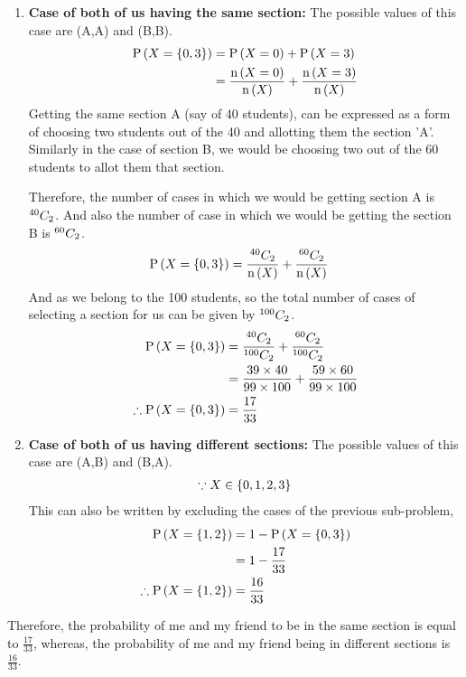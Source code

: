\documentclass[journal,12pt,twocolumn]{IEEEtran}
\begin{document}
    \begin{enumerate}[label=(\roman*)]
    \item\textbf{Case of both of us having the same section:} The possible values of this case are (A,A) and (B,B).
    \begin{align}
\text{P}\left(X=\left\{0,3\right\}\right) &= \text{P}\left(X=0\right) + \text{P}\left(X=3\right)\\
                             &= \frac{\text{n}\left(X = 0\right)}{\text{n}\left(X\right)}+\frac{\text{n}\left(X = 3\right)}{\text{n}\left(X\right)}
\end{align}
Getting the same section A (say of 40 students), can be expressed as a form of choosing two students out of the 40 and allotting them the section 'A'. Similarly in the case of section B, we would be choosing two out of the 60 students to allot them that section.\\
\par Therefore, the number of cases in which we would be getting section A is ${}^{40}C_{2}$. And also the number of case in which we would be getting the section B is ${}^{60}C_{2}$.\\
\begin{align}
\text{P}\left(X=\left\{0,3\right\}\right) &= \frac{{}^{40}C_{2}}{\text{n}\left(X\right)} + \frac{{}^{60}C_{2}}{\text{n}\left(X\right)}
\end{align}
And as we belong to the 100 students, so the total number of cases of selecting a section for us can be given by ${}^{100}C_{2}$.
\begin{align}
\text{P}\left(X=\left\{0,3\right\}\right) &= \frac{{}^{40}C_{2}}{{}^{100}C_{2}} + \frac{{}^{60}C_{2}}{{}^{100}C_{2}}  \quad \\
                             &= \frac{39 \times 40}{99 \times 100}+\frac{59 \times 60}{99 \times 100}\\
\therefore\text{P}\left(X=\left\{0,3\right\}\right) &= \frac{17}{33}
    \end{align}
    \item\textbf{Case of both of us having different sections:} The possible values of this case are (A,B) and (B,A).
    \begin{align*}
    \because X \in \left\{0,1,2,3\right\}
    \end{align*}
    This can also be written by excluding the cases of the previous sub-problem,
    \begin{align}
    \text{P}\left(X=\left\{1,2\right\}\right) &= 1-\text{P}\left(X=\left\{0,3\right\}\right)\\
                                 &= 1-\frac{17}{33}\\
\therefore\text{P}\left(X=\left\{1,2\right\}\right) &= \frac{16}{33}
    \end{align}
	\end{enumerate}
	\par Therefore, the probability of me and my friend to be in the same section is equal to $\frac{17}{33}$, whereas, the probability of me and my friend being in different sections is $\frac{16}{33}$.
\end{document}
